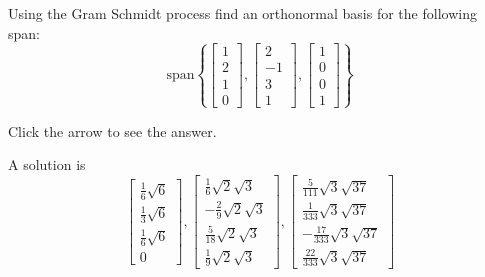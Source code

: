 \documentclass{ximera}
\begin{document}
\begin{problem}\label{prob:use_GS_on_span_2} 
Using the Gram Schmidt process find an
orthonormal basis for the following span:
\[
\mbox{span}\left\{ \left[
\begin{array}{r}
 1 \\
2 \\
1 \\
0
\end{array}
\right]
,\left[
\begin{array}{r}
2 \\
-1 \\
3 \\
1
\end{array}
\right] , \left[
\begin{array}{r}
 1 \\
0 \\
0 \\
1
\end{array}
\right] \right\}
\]

Click the arrow to see the answer.
\begin{expandable}
A solution is
\[
\left[
\begin{array}{c}
\frac{1}{6}\sqrt{6} \\
\frac{1}{3}\sqrt{6} \\
\frac{1}{6}\sqrt{6} \\
0
\end{array}
\right] ,\left[
\begin{array}{c}
\frac{1}{6}\sqrt{2}\sqrt{3} \\
-\frac{2}{9}\sqrt{2}\sqrt{3} \\
\frac{5}{18}\sqrt{2}\sqrt{3} \\
\frac{1}{9}\sqrt{2}\sqrt{3}
\end{array}
\right] ,\left[
\begin{array}{c}
\frac{5}{111}\sqrt{3}\sqrt{37} \\
\frac{1}{333}\sqrt{3}\sqrt{37} \\
-\frac{17}{333}\sqrt{3}\sqrt{37} \\
\frac{22}{333}\sqrt{3}\sqrt{37}
\end{array}
\right]
\]
\end{expandable}
\end{problem}
\end{document}
